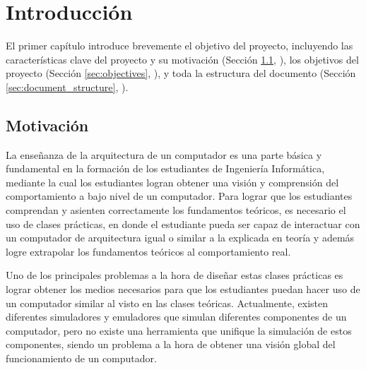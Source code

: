 \chead[]{}
\renewcommand{\headrulewidth}{0.5pt}

\lfoot[]{}
\cfoot[]{}
\rfoot[]{}
\renewcommand{\footrulewidth}{0pt}

\chapter{Introducción}
\label{ch:introduction}

El primer capítulo introduce brevemente el objetivo del proyecto, incluyendo las características clave del proyecto y su motivación (Sección \ref{sec:background_and_motivation}, \textit{}), los objetivos del proyecto (Sección \ref{sec:objectives}, \textit{}), y toda la estructura del documento (Sección \ref{sec:document_structure}, \textit{}).

\section{Motivación}
\label{sec:background_and_motivation}

La enseñanza de la arquitectura de un computador es una parte básica y fundamental en la formación de los estudiantes de Ingeniería Informática, mediante la cual los estudiantes logran obtener una visión y comprensión del comportamiento a bajo nivel de un computador. Para lograr que los estudiantes comprendan y asienten correctamente los fundamentos teóricos, es necesario el uso de clases prácticas, en donde el estudiante pueda ser capaz de interactuar con un computador de arquitectura igual o similar a la explicada en teoría y además logre extrapolar los fundamentos teóricos al comportamiento real.

Uno de los principales problemas a la hora de diseñar estas clases prácticas es lograr obtener los medios necesarios para que los estudiantes puedan hacer uso de un computador similar al visto en las clases teóricas. Actualmente, existen diferentes simuladores y emuladores que simulan diferentes componentes de un computador, pero no existe una herramienta que unifique la simulación de estos componentes, siendo un problema a la hora de obtener una visión global del funcionamiento de un computador.

